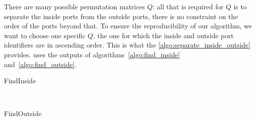 There are many possible permutation matrices $Q$: all that is required for $Q$ is to separate the inside ports from the outside ports, there is no constraint on the order of the ports beyond that.
To ensure the reproducibility of our algorithm, we want to choose one specific $Q$, the one for which the inside and outside port identifiers are in ascending order.
This is what the \cref{algo:separate_inside_outside} provides.
 uses the outputs of algorithms~\ref{algo:find_inside} and~\ref{algo:find_outside}.

\begin{algorithm}
    \caption{FindInside}
    \label{algo:find_inside}
    \begin{algorithmic}
         
        \EndFor
        \\  
        \EndFunction
    \end{algorithmic}
\end{algorithm}

\begin{algorithm}
    \caption{FindOutside}
    \label{algo:find_outside}
    \begin{algorithmic}
         
         
        \\  
        \EndFunction
    \end{algorithmic}
\end{algorithm}

